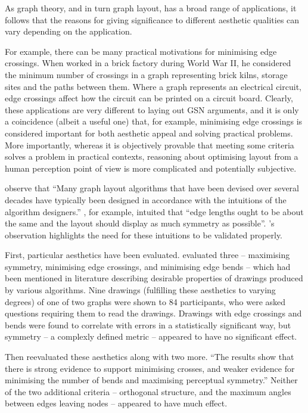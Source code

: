 As graph theory, and in turn graph layout, has a broad range of applications, it follows that the reasons for giving significance to different aesthetic qualities can vary depending on the application.

For example, there can be many practical motivations for minimising edge crossings.
When \citet{JGT:JGT3190010105} worked in a brick factory during World War II,
he considered the minimum number of crossings in a graph representing
brick kilns, storage sites and the paths between them.
Where a graph represents an electrical circuit, edge crossings affect how the circuit can be printed on a circuit board.
Clearly, these applications are very different to laying out GSN arguments, and it is only a coincidence (albeit a useful one) that, for example, minimising edge crossings is considered important for both aesthetic appeal and solving practical problems.
More importantly, whereas it is objectively provable that meeting some criteria solves a problem in practical contexts, reasoning about optimising layout from a human perception point of view is more complicated and potentially subjective.

\citet{5674033} observe that ``Many graph layout algorithms that have been devised over
several decades have typically been designed in accordance with the intuitions of the algorithm designers.''
\citet{eades84}, for example, intuited that ``edge lengths ought to be about the same and the layout should display as much symmetry as possible''.
\citeauthor{5674033}'s observation highlights the need for these intuitions to be validated properly.

First, particular aesthetics have been evaluated. \citet{Purchase1997basis} evaluated three -- maximising symmetry, minimising edge crossings, and minimising edge bends -- which had been mentioned in literature describing desirable properties of drawings produced by various algorithms. 
Nine drawings (fulfilling these aesthetics to varying degrees) of one of two graphs were shown to 84 participants,
who were asked questions requiring them to read the drawings.
Drawings with edge crossings and bends were found to correlate with errors in a statistically significant way, but symmetry -- a complexly defined metric -- appeared to have no significant effect.

Then \citet{Purchase1997which} reevaluated these aesthetics along with two more. ``The results show that there is strong
evidence to support minimising crosses, and weaker evidence for minimising the number of bends and maximising perceptual symmetry.''
Neither of the two additional criteria -- orthogonal structure, and the maximum angles between edges leaving nodes -- appeared to have much effect.

